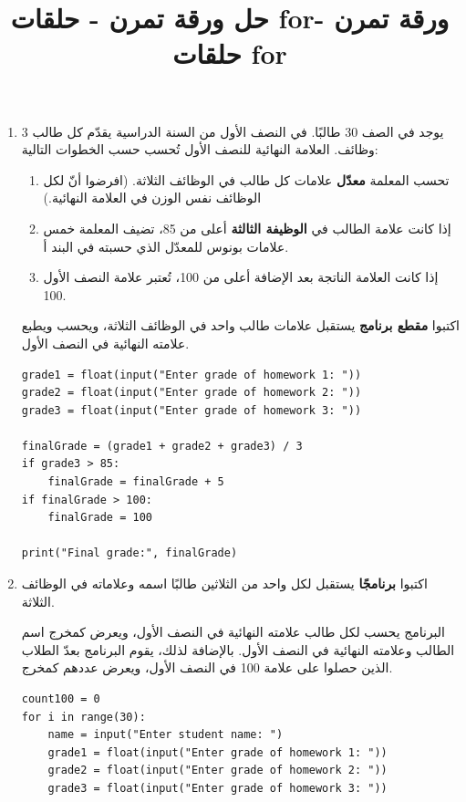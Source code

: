 \documentclass[14pt]{extarticle}
\title{حل ورقة تمرن - حلقات \textenglish{for}}
\title{ورقة تمرن - حلقات \textenglish{for}}
\begin{document}
\maketitle
\thispagestyle{fancy}

\begin{enumerate}[itemsep=3em]

\item يوجد في الصف 30 طالبًا. في النصف الأول من السنة الدراسية يقدّم كل طالب 3 وظائف. العلامة النهائية للنصف الأول تُحسب حسب الخطوات التالية:
\begin{enumerate}[label=\alph*.]
    \item تحسب المعلمة \textbf{معدّل} علامات كل طالب في الوظائف الثلاثة. (افرضوا أنّ لكل الوظائف نفس الوزن في العلامة النهائية.)
    \item إذا كانت علامة الطالب في \textbf{الوظيفة الثالثة} أعلى من 85، تضيف المعلمة خمس علامات بونوس للمعدّل الذي حسبته في البند أ.
    \item إذا كانت العلامة الناتجة بعد الإضافة أعلى من 100، تُعتبر علامة النصف الأول 100.
\end{enumerate}

اكتبوا \textbf{مقطع برنامج} يستقبل علامات طالب واحد في الوظائف الثلاثة، ويحسب ويطبع علامته النهائية في النصف الأول.

\ifwithsols
\begin{boxSolution}
\begin{english}
\begin{verbatim}
grade1 = float(input("Enter grade of homework 1: "))
grade2 = float(input("Enter grade of homework 2: "))
grade3 = float(input("Enter grade of homework 3: "))

finalGrade = (grade1 + grade2 + grade3) / 3
if grade3 > 85:
    finalGrade = finalGrade + 5
if finalGrade > 100:
    finalGrade = 100

print("Final grade:", finalGrade)
\end{verbatim}
\end{english}
\end{boxSolution}
\fi

\item اكتبوا \textbf{برنامجًا} يستقبل لكل واحد من الثلاثين طالبًا اسمه وعلاماته في الوظائف الثلاثة.

البرنامج يحسب لكل طالب علامته النهائية في النصف الأول، ويعرض كمخرج اسم الطالب وعلامته النهائية في النصف الأول. بالإضافة لذلك، يقوم البرنامج بعدّ الطلاب الذين حصلوا على علامة 100 في النصف الأول، ويعرض عددهم كمخرج.

\ifwithsols
\begin{boxSolution}
\begin{english}
\begin{verbatim}
count100 = 0
for i in range(30):
    name = input("Enter student name: ")
    grade1 = float(input("Enter grade of homework 1: "))
    grade2 = float(input("Enter grade of homework 2: "))
    grade3 = float(input("Enter grade of homework 3: "))


\end{verbatim}
\end{english}
\end{boxSolution}
\end{enumerate}
\end{document}
